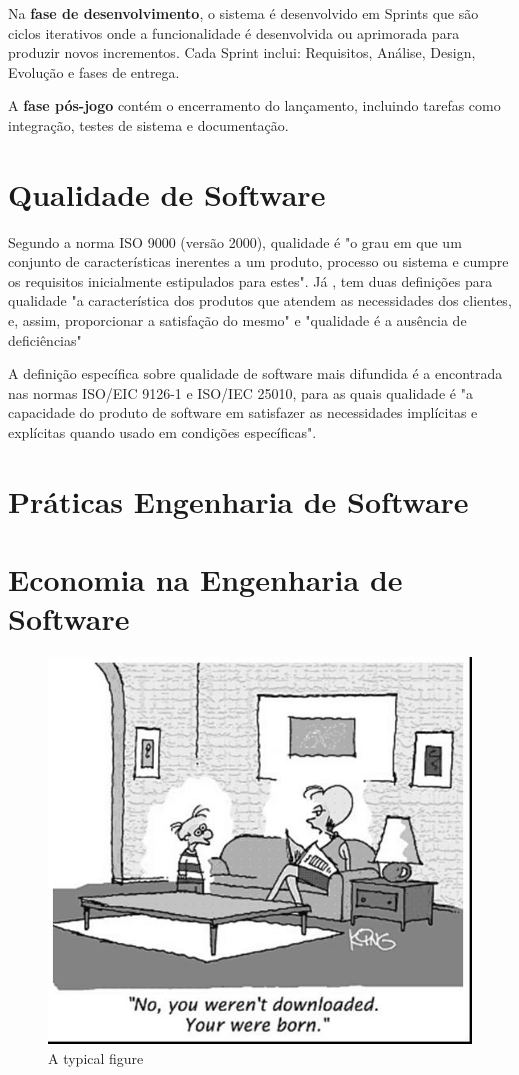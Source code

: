 \documentclass[12pt]{article}
\begin{document}
Na \textbf{fase de desenvolvimento}, o sistema é desenvolvido em Sprints que são ciclos iterativos onde a funcionalidade é desenvolvida ou aprimorada para produzir novos incrementos. Cada Sprint inclui: Requisitos, Análise, Design, Evolução e fases de entrega.

A \textbf{fase pós-jogo} contém o encerramento do lançamento, incluindo tarefas como integração, testes de sistema e documentação. \cite{Kumar2014}


\section{Qualidade de Software}

Segundo a norma ISO 9000 (versão 2000), qualidade é "o grau em que um conjunto de características inerentes a um produto, processo ou sistema e cumpre os requisitos inicialmente estipulados para estes". Já \cite{Juran1998}, tem duas definições para qualidade "a característica dos produtos que atendem as necessidades dos clientes, e, assim, proporcionar a satisfação do mesmo" e "qualidade é a ausência de deficiências"

A definição específica sobre qualidade de software mais difundida é a encontrada nas normas ISO/EIC 9126-1 e ISO/IEC 25010, para as quais qualidade é "a capacidade do produto de software em satisfazer as necessidades implícitas e explícitas quando usado em condições específicas".





\section{Práticas Engenharia de Software}
\section{Economia na Engenharia de Software}


\begin{figure}[htp]
\centering
\includegraphics[width=.5\textwidth]{fig1.jpg}
\caption{A typical figure}
\label{fig:exampleFig1}
\end{figure}
\end{document}
